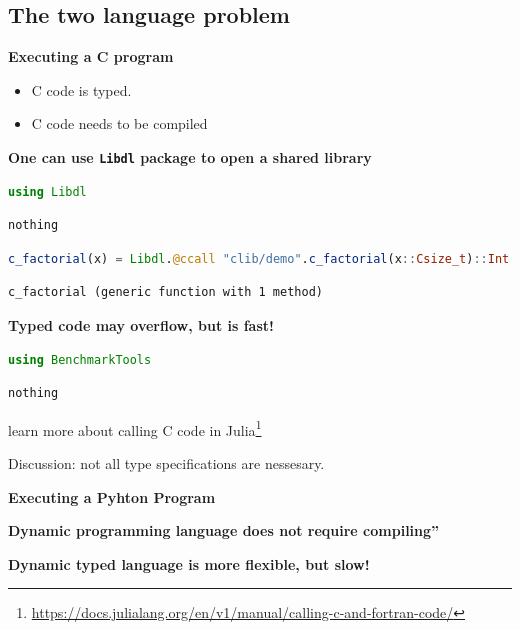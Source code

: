 \documentclass[
  notoc %
]{tufte-book}
\DeclareRobustCommand{\href}[2]{#2\footnote{\url{#1}}}
\newcommand{\passthrough}[1]{#1}
\begin{document}
\hypertarget{the-two-language-problem}{%
\subsection{The two language problem}\label{the-two-language-problem}}

\textbf{Executing a C program}

\begin{itemize}
\item
  C code is typed.
\item
  C code needs to be compiled
\end{itemize}

\textbf{One can use \passthrough{\lstinline!Libdl!} package to open a
shared library}

\begin{lstlisting}[language=Julia]
using Libdl
\end{lstlisting}

\begin{lstlisting}[language=Output]
nothing
\end{lstlisting}

\begin{lstlisting}[language=Julia]
c_factorial(x) = Libdl.@ccall "clib/demo".c_factorial(x::Csize_t)::Int
\end{lstlisting}

\begin{lstlisting}[language=Output]
c_factorial (generic function with 1 method)
\end{lstlisting}

\textbf{Typed code may overflow, but is fast!}

\begin{lstlisting}[language=Julia]
using BenchmarkTools
\end{lstlisting}

\begin{lstlisting}[language=Output]
nothing
\end{lstlisting}

\href{https://docs.julialang.org/en/v1/manual/calling-c-and-fortran-code/}{learn
more about calling C code in Julia}

Discussion: not all type specifications are nessesary.

\textbf{Executing a Pyhton Program}

\textbf{Dynamic programming language does not require compiling''}

\textbf{Dynamic typed language is more flexible, but slow!}
\end{document}

